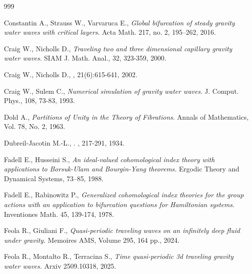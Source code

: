 \documentclass[11pt,a4paper,reqno]{article}
\numberwithin{equation}{section}
\theoremstyle{definition}
\begin{document}
\begin{footnotesize}
\begin{thebibliography}{999}

Constantin A., Strauss W., Varvaruca E., 
{\it Global bifurcation of steady gravity water waves with critical layers}.
Acta Math.   217,  no. 2, 195–262, 2016.



	Craig W., Nicholls  D., 
	\emph{Traveling two and three dimensional capillary gravity water waves}.  SIAM J. Math. Anal., 
	32, 323-359, 2000.

Craig W., Nicholls D.,
, 21(6):615-641, 2002.


 
	Craig W., Sulem  C., 
	\emph{Numerical simulation of gravity water waves}. J. Comput. Phys., 
	108, 73-83, 1993.

      Dold A., 
    \emph{Partitions of Unity in the Theory of Fibrations}. Annals of Mathematics, Vol. 78, No. 2, 1963.  

		Dubreil-Jacotin M.-L.,
		.
		, 217-291, 1934.


Fadell  E.,  Husseini S., 
{\it An ideal-valued cohomological index theory with applications to {B}orsuk-{U}lam and {B}ourgin-{Y}ang theorems.} Ergodic Theory and Dynamical Systems,  73--85,
1988. 


 Fadell E., Rabinowitz P., {\it Generalized 
cohomological index theories for the group actions 
with an application to bifurcation questions  for Hamiltonian
systems}. Inventiones Math. 45, 139-174, 1978.






		Feola R.,  Giuliani F.,
		\emph{Quasi-periodic traveling waves on an infinitely deep fluid under gravity.}
		Memoires AMS, Volume 295,  164 pp., 2024.


Feola R., Montalto R., Terracina S.,  
{\it Time  quasi-periodic 3d traveling gravity water waves.}
Arxiv 2509.10318, 2025. 



\end{thebibliography}
\end{footnotesize}
\end{document}
